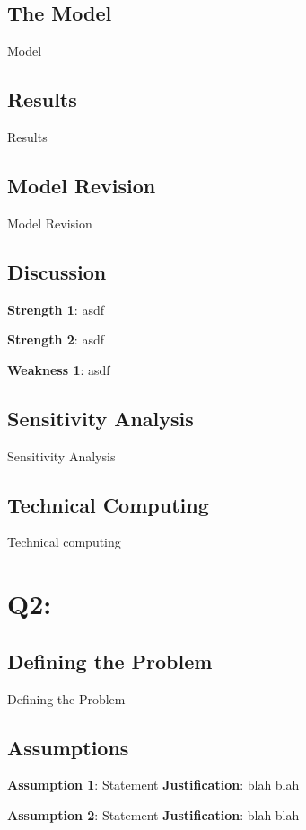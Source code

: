 \documentclass{mcm}
\numberwithin{figure}{section}
\numberwithin{table}{section}
\numberwithin{equation}{section}
\begin{document}
    \subsection{The Model}
    Model

    \subsection{Results}
    Results

    \subsection{Model Revision}
    Model Revision

    \subsection{Discussion}

    \noindent\textbf{Strength 1}: asdf

    \noindent\textbf{Strength 2}: asdf

    \noindent\textbf{Weakness 1}: asdf

    \subsection{Sensitivity Analysis}
    Sensitivity Analysis

    \subsection{Technical Computing}
    Technical computing

    \section{Q2:}

    \subsection{Defining the Problem}
    Defining the Problem

    \subsection{Assumptions}
    \noindent\textbf{Assumption 1}: Statement
    \textbf{Justification}: blah blah

    \noindent\textbf{Assumption 2}: Statement
    \textbf{Justification}: blah blah
\end{document}

